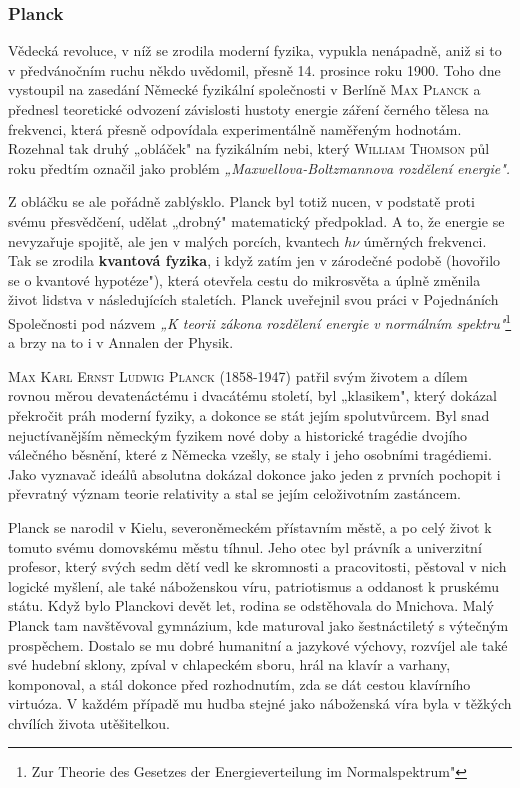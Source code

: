       \subsubsection{Planck}
        Vědecká revoluce, v níž se zrodila moderní fyzika, vypukla nenápadně, aniž si to v
        předvánočním ruchu někdo uvědomil, přesně 14. prosince roku 1900. Toho dne vystoupil na
        zasedání Německé fyzikální společnosti v Berlíně \textsc{Max Planck} a přednesl teoretické
        odvození závislosti hustoty energie záření černého tělesa na frekvenci, která přesně
        odpovídala experimentálně naměřeným hodnotám. Rozehnal tak druhý „obláček" na fyzikálním
        nebi, který \textsc{William Thomson} půl roku předtím označil jako problém
        \emph{„Maxwellova-Boltzmannova rozdělení energie".}

        Z obláčku se ale pořádně zablýsklo. Planck byl totiž nucen, v podstatě proti svému
        přesvědčení, udělat „drobný" matematický předpoklad. A to, že energie se nevyzařuje spojitě,
        ale jen v malých porcích, kvantech \(h\nu\) úměrných frekvenci. Tak se zrodila
        \textbf{kvantová fyzika}, i když zatím jen v zárodečné podobě (hovořilo se o kvantové
        hypotéze"), která otevřela cestu do mikrosvěta a úplně změnila život lidstva v následujících
        staletích. Planck uveřejnil svou práci v Pojednáních Společnosti pod názvem \emph{„K teorii
        zákona rozdělení energie v normálním spektru"}\footnote{Zur Theorie des Gesetzes der
        Energieverteilung im Normalspektrum"} a brzy na to i v Annalen der Physik.

        \textsc{Max Karl Ernst Ludwig Planck} (1858-1947) patřil svým životem a dílem rovnou měrou
        devatenáctému i dvacátému století, byl „klasikem", který dokázal překročit práh moderní
        fyziky, a dokonce se stát jejím spolutvůrcem. Byl snad nejuctívanějším německým fyzikem nové
        doby a historické tragédie dvojího válečného běsnění, které z Německa vzešly, se staly i
        jeho osobními tragédiemi. Jako vyznavač ideálů absolutna dokázal dokonce jako jeden z
        prvních pochopit i převratný význam teorie relativity a stal se jejím celoživotním
        zastáncem.

        Planck se narodil v Kielu, severoněmeckém přístavním městě, a po celý život k tomuto svému
        domovskému městu tíhnul. Jeho otec byl právník a univerzitní profesor, který svých sedm dětí
        vedl ke skromnosti a pracovitosti, pěstoval v nich logické myšlení, ale také náboženskou
        víru, patriotismus a oddanost k pruskému státu. Když bylo Planckovi devět let, rodina se
        odstěhovala do Mnichova. Malý Planck tam navštěvoval gymnázium, kde maturoval jako
        šestnáctiletý s výtečným prospěchem. Dostalo se mu dobré humanitní a jazykové výchovy,
        rozvíjel ale také své hudební sklony, zpíval v chlapeckém sboru, hrál na klavír a varhany,
        komponoval, a stál dokonce před rozhodnutím, zda se dát cestou klavírního virtuóza. V každém
        případě mu hudba stejné jako náboženská víra byla v těžkých chvílích života utěšitelkou.

